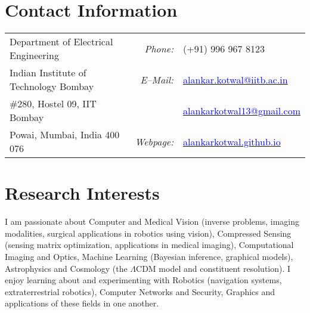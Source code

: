 \documentclass[margin,line]{res}
\begin{document}

\begin{resume}
\section{\sc Contact Information}
\vspace{.05in}
\begin{tabular}{@{}p{2.9in}p{.5in}p{3in}}
Department of Electrical Engineering & \multicolumn{1}{r}{\it Phone:}  &(+91) 996 967 8123 \\            
Indian Institute of Technology Bombay &\multicolumn{1}{r}{\it E--Mail:}& \href{mailto:alankar.kotwal@iitb.ac.in}{\textcolor{blue}{alankar.kotwal@iitb.ac.in}} \\ 
\#280, Hostel 09, IIT Bombay & & \href{mailto:alankarkotwal13@gmail.com}{\textcolor{blue}{alankarkotwal13@gmail.com}} \\ 
Powai, Mumbai, India 400 076 & \multicolumn{1}{r}{\it Webpage:} &\href{http://alankarkotwal.github.io/}{\textcolor{blue}{alankarkotwal.github.io}} \\     
\end{tabular}

\section{\sc Research Interests}
\lettrine[lines=2]{I}{} am passionate about Computer and Medical Vision (inverse problems, imaging modalities, surgical applications in robotics using vision), Compressed Sensing (sensing matrix optimization, applications in medical imaging), Computational Imaging and Optics, Machine Learning (Bayesian inference, graphical models), Astrophysics and Cosmology (the $\Lambda$CDM model and constituent resolution). I enjoy learning about and experimenting with Robotics (navigation systems, extraterrestrial robotics), Computer Networks and Security, Graphics and applications of these fields in one another.


\end{resume}
\end{document}
